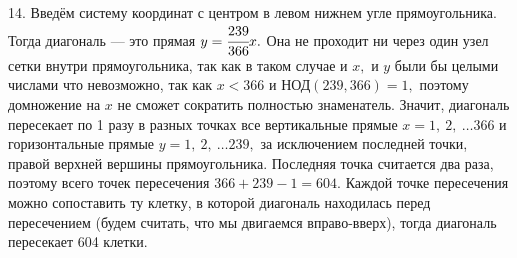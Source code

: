 14. Введём систему координат с центром в левом нижнем угле прямоугольника. Тогда диагональ --- это прямая $y=\cfrac{239}{366}x.$ Она не проходит ни через один узел сетки внутри прямоугольника, так как в таком случае и $x,$ и $y$ были бы целыми числами что невозможно, так как $x<366$ и $\text{НОД}(239,366)=1,$ поэтому домножение на $x$ не сможет сократить полностью знаменатель. Значит, диагональ пересекает по 1 разу в разных точках все вертикальные прямые $x=1,\ 2,\ \ldots 366$ и горизонтальные прямые $y=1,\ 2,\ \ldots 239,$ за исключением последней точки, правой верхней вершины прямоугольника. Последняя точка считается два раза, поэтому всего точек пересечения $366+239-1=604.$ Каждой точке пересечения можно сопоставить ту клетку, в которой диагональ находилась перед пересечением (будем считать, что мы двигаемся вправо-вверх), тогда диагональ пересекает 604 клетки.
\begin{figure}[ht!]
\end{figure}\\

